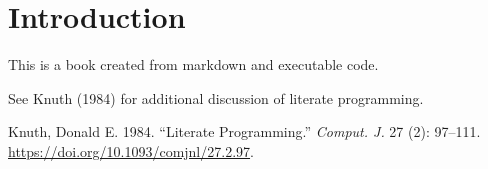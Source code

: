 \documentclass[
  a4paper,
  DIV=11,
  numbers=noendperiod]{scrreprt}
\author{}
\date{}
\newlength{\cslhangindent}
\newenvironment{CSLReferences}[2] %
 {\begin{list}{}{%
  \setlength{\itemindent}{0pt}
  \setlength{\leftmargin}{0pt}
  \setlength{\parsep}{0pt}
  \ifodd #1
   \setlength{\leftmargin}{\cslhangindent}
   \setlength{\itemindent}{-1\cslhangindent}
  \fi
  \setlength{\itemsep}{#2\baselineskip}}}
 {\end{list}}
\begin{document}
\chapter{Introduction}\label{introduction}

This is a book created from markdown and executable code.

See Knuth (1984) for additional discussion of literate programming.

\label{refs}
\begin{CSLReferences}{1}{0}
Knuth, Donald E. 1984. {``Literate Programming.''} \emph{Comput. J.} 27
(2): 97--111. \url{https://doi.org/10.1093/comjnl/27.2.97}.

\end{CSLReferences}
\end{document}
